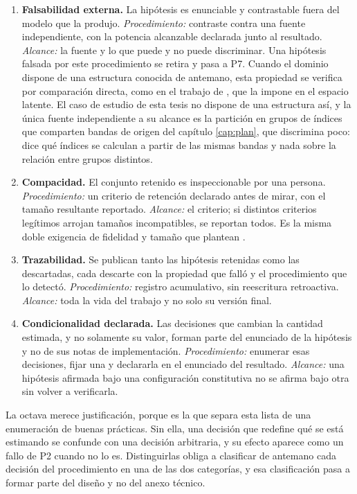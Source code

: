 \begin{enumerate}[itemsep=3pt, leftmargin=2.2em, label=\textbf{P\arabic*.}]
\item \textbf{Falsabilidad externa.} La hipótesis es enunciable y contrastable fuera del modelo que la produjo. \emph{Procedimiento:} contraste contra una fuente independiente, con la potencia alcanzable declarada junto al resultado. \emph{Alcance:} la fuente y lo que puede y no puede discriminar. Una hipótesis falsada por este procedimiento se retira y pasa a P7. Cuando el dominio dispone de una estructura conocida de antemano, esta propiedad se verifica por comparación directa, como en el trabajo de \textcite{teleconnections2026causal}, que la impone en el espacio latente. El caso de estudio de esta tesis no dispone de una estructura así, y la única fuente independiente a su alcance es la partición en grupos de índices que comparten bandas de origen del capítulo \ref{cap:plan}, que discrimina poco: dice qué índices se calculan a partir de las mismas bandas y nada sobre la relación entre grupos distintos.

\item \textbf{Compacidad.} El conjunto retenido es inspeccionable por una persona. \emph{Procedimiento:} un criterio de retención declarado antes de mirar, con el tamaño resultante reportado. \emph{Alcance:} el criterio; si distintos criterios legítimos arrojan tamaños incompatibles, se reportan todos. Es la misma doble exigencia de fidelidad y tamaño que plantean \textcite{rulexai2024events}.

\item \textbf{Trazabilidad.} Se publican tanto las hipótesis retenidas como las descartadas, cada descarte con la propiedad que falló y el procedimiento que lo detectó. \emph{Procedimiento:} registro acumulativo, sin reescritura retroactiva. \emph{Alcance:} toda la vida del trabajo y no solo su versión final.

\item \textbf{Condicionalidad declarada.} Las decisiones que cambian la cantidad estimada, y no solamente su valor, forman parte del enunciado de la hipótesis y no de sus notas de implementación. \emph{Procedimiento:} enumerar esas decisiones, fijar una y declararla en el enunciado del resultado. \emph{Alcance:} una hipótesis afirmada bajo una configuración constitutiva no se afirma bajo otra sin volver a verificarla.

\end{enumerate}

La octava merece justificación, porque es la que separa esta lista de una enumeración de buenas prácticas. Sin ella, una decisión que redefine qué se está estimando se confunde con una decisión arbitraria, y su efecto aparece como un fallo de P2 cuando no lo es. Distinguirlas obliga a clasificar de antemano cada decisión del procedimiento en una de las dos categorías, y esa clasificación pasa a formar parte del diseño y no del anexo técnico.

